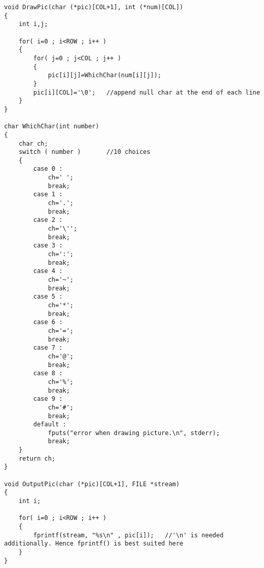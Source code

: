 \begin{solution}
\begin{verbatim}
void DrawPic(char (*pic)[COL+1], int (*num)[COL])
{
	int i,j;

	for( i=0 ; i<ROW ; i++ )
	{
		for( j=0 ; j<COL ; j++ )
		{
			pic[i][j]=WhichChar(num[i][j]);
		}
		pic[i][COL]='\0';	//append null char at the end of each line
	}
}

char WhichChar(int number)
{
	char ch;
	switch ( number )		//10 choices
	{
		case 0 :
			ch=' ';
			break;
		case 1 :
			ch='.';
			break;
		case 2 :
			ch='\'';
			break;
		case 3 :
			ch=':';
			break;
		case 4 :
			ch='~';
			break;
		case 5 :
			ch='*';
			break;
		case 6 :
			ch='=';
			break;
		case 7 :
			ch='@';
			break;
		case 8 :
			ch='%';
			break;
		case 9 :
			ch='#';
			break;
		default :
			fputs("error when drawing picture.\n", stderr);
			break;
	}
	return ch;
}

void OutputPic(char (*pic)[COL+1], FILE *stream)
{
	int i;

	for( i=0 ; i<ROW ; i++ )
	{
		fprintf(stream, "%s\n" , pic[i]);	//'\n' is needed additionally. Hence fprintf() is best suited here
	}
}
  \end{verbatim}
\end{solution}

